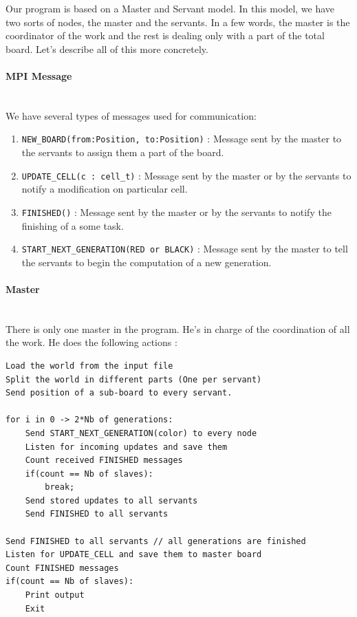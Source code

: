 \documentclass[a4paper,10pt]{article}
\begin{document}
Our program is based on a Master and Servant model.
In this model, we have two sorts of nodes, the master and the servants.
In a few words, the master is the coordinator of the work and the rest is dealing only with a part of the total board.
Let's describe all of this more concretely.

\paragraph{MPI Message}
~\\

We have several types of messages used for communication:

\begin{enumerate}
 \item \texttt{NEW\_BOARD(from:Position, to:Position)} : Message sent by the master to the servants to assign them a part of the board.
 \item \texttt{UPDATE\_CELL(c : cell\_t)} : Message sent by the master or by the servants to notify a modification on particular cell.
 \item \texttt{FINISHED()} : Message sent by the master or by the servants to notify the finishing of a some task.
 \item \texttt{START\_NEXT\_GENERATION(RED or BLACK)} : Message sent by the master to tell the servants to begin the computation
 of a new generation.
\end{enumerate}

\paragraph{Master}
~\\

There is only one master in the program. He's in charge of the coordination of all the work. He does the following actions :

\begin{lstlisting}
Load the world from the input file
Split the world in different parts (One per servant)
Send position of a sub-board to every servant.

for i in 0 -> 2*Nb of generations:
    Send START_NEXT_GENERATION(color) to every node
    Listen for incoming updates and save them
    Count received FINISHED messages
    if(count == Nb of slaves):
		break;
    Send stored updates to all servants
    Send FINISHED to all servants
    
Send FINISHED to all servants // all generations are finished
Listen for UPDATE_CELL and save them to master board
Count FINISHED messages
if(count == Nb of slaves):
    Print output
    Exit
\end{lstlisting}
\end{document}
